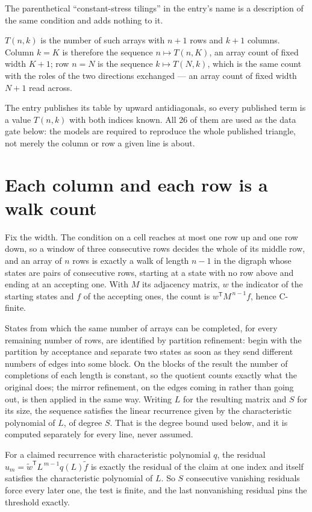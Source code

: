 \documentclass[11pt]{article}
\theoremstyle{definition}
\begin{document}
The parenthetical ``constant-stress tilings'' in the entry's name is a description of the same condition and adds nothing to it.

$T(n,k)$ is the number of such arrays with $n + 1$ rows and $k + 1$ columns. Column $k = K$ is therefore the sequence $n \mapsto T(n,K)$, an array count of fixed width $K + 1$; row $n = N$ is the sequence $k \mapsto T(N,k)$, which is the same count with the roles of the two directions exchanged --- an array count of fixed width $N + 1$ read across.

The entry publishes its table by upward antidiagonals, so every published term is a value $T(n,k)$ with both indices known. All 26 of them are used as the data gate below: the models are required to reproduce the whole published triangle, not merely the column or row a given line is about.

\section{Each column and each row is a walk count}

Fix the width. The condition on a cell reaches at most one row up and one row down, so a window of three consecutive rows decides the whole of its middle row, and an array of $n$ rows is exactly a walk of length $n-1$ in the digraph whose states are pairs of consecutive rows, starting at a state with no row above and ending at an accepting one. With $M$ its adjacency matrix, $w$ the indicator of the starting states and $f$ of the accepting ones, the count is $w^{\mathsf T}M^{\,n-1}f$, hence C-finite.

States from which the same number of arrays can be completed, for every remaining number of rows, are identified by partition refinement: begin with the partition by acceptance and separate two states as soon as they send different numbers of edges into some block. On the blocks of the result the number of completions of each length is constant, so the quotient counts exactly what the original does; the mirror refinement, on the edges coming in rather than going out, is then applied in the same way. Writing $L$ for the resulting matrix and $S$ for its size, the sequence satisfies the linear recurrence given by the characteristic polynomial of $L$, of degree $S$. That is the degree bound used below, and it is computed separately for every line, never assumed.

For a claimed recurrence with characteristic polynomial $q$, the residual $u_m = \tilde w^{\mathsf T}L^{\,m-1}q(L)\tilde f$ is exactly the residual of the claim at one index and itself satisfies the characteristic polynomial of $L$. So $S$ consecutive vanishing residuals force every later one, the test is finite, and the last nonvanishing residual pins the threshold exactly.
\end{document}
